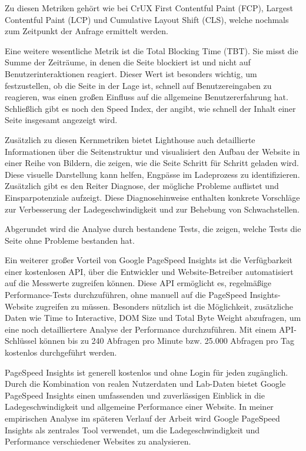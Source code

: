 Zu diesen Metriken gehört wie bei CrUX  First Contentful Paint (FCP), Largest Contentful Paint (LCP) und Cumulative Layout Shift (CLS), welche nochmals zum Zeitpunkt der Anfrage ermittelt werden. 

Eine weitere wesentliche Metrik ist die Total Blocking Time (TBT). Sie misst die Summe der Zeiträume, in denen die Seite blockiert ist und nicht auf Benutzerinteraktionen reagiert. Dieser Wert ist besonders wichtig, um festzustellen, ob die Seite in der Lage ist, schnell auf Benutzereingaben zu reagieren, was einen großen Einfluss auf die allgemeine Benutzererfahrung hat. Schließlich gibt es noch den Speed Index, der angibt, wie schnell der Inhalt einer Seite insgesamt angezeigt wird.

Zusätzlich zu diesen Kernmetriken bietet Lighthouse auch detaillierte Informationen über die Seitenstruktur und visualisiert den Aufbau der Website in einer Reihe von Bildern, die zeigen, wie die Seite Schritt für Schritt geladen wird. Diese visuelle Darstellung kann helfen, Engpässe im Ladeprozess zu identifizieren. Zusätzlich gibt es den Reiter Diagnose, der mögliche Probleme auflistet und Einsparpotenziale aufzeigt. Diese Diagnosehinweise enthalten  konkrete Vorschläge zur Verbesserung der Ladegeschwindigkeit und zur Behebung von Schwachstellen.

Abgerundet wird die Analyse durch bestandene Tests, die zeigen, welche Tests die Seite ohne Probleme bestanden hat. 

Ein weiterer großer Vorteil von Google PageSpeed Insights ist die Verfügbarkeit einer kostenlosen API, über die Entwickler und Website-Betreiber automatisiert auf die Messwerte zugreifen können. Diese API ermöglicht es, regelmäßige Performance-Tests durchzuführen, ohne manuell auf die PageSpeed Insights-Website zugreifen zu müssen. Besonders nützlich ist die Möglichkeit, zusätzliche Daten wie Time to Interactive, DOM Size und Total Byte Weight abzufragen, um eine noch detailliertere Analyse der Performance durchzuführen. Mit einem API-Schlüssel können bis zu 240 Abfragen pro Minute bzw. 25.000 Abfragen pro Tag kostenlos durchgeführt werden.

PageSpeed Insights ist generell kostenlos und ohne Login für jeden zugänglich. Durch die Kombination von realen Nutzerdaten und Lab-Daten bietet Google PageSpeed Insights einen umfassenden und zuverlässigen Einblick in die Ladegeschwindigkeit und allgemeine Performance einer Website. In meiner empirischen Analyse im späteren Verlauf der Arbeit wird Google PageSpeed Insights als zentrales Tool verwendet, um die Ladegeschwindigkeit und Performance verschiedener Websites zu analysieren.

